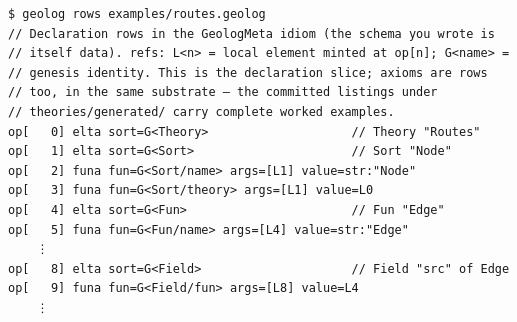 \begin{Verbatim}[fontsize=\small,frame=leftline,rulecolor=\color{accentmid},framesep=3mm,xleftmargin=3mm]
$ geolog rows examples/routes.geolog
// Declaration rows in the GeologMeta idiom (the schema you wrote is
// itself data). refs: L<n> = local element minted at op[n]; G<name> =
// genesis identity. This is the declaration slice; axioms are rows
// too, in the same substrate — the committed listings under
// theories/generated/ carry complete worked examples.
op[   0] elta sort=G<Theory>                    // Theory "Routes"
op[   1] elta sort=G<Sort>                      // Sort "Node"
op[   2] funa fun=G<Sort/name> args=[L1] value=str:"Node"
op[   3] funa fun=G<Sort/theory> args=[L1] value=L0
op[   4] elta sort=G<Fun>                       // Fun "Edge"
op[   5] funa fun=G<Fun/name> args=[L4] value=str:"Edge"
    ⋮
op[   8] elta sort=G<Field>                     // Field "src" of Edge
op[   9] funa fun=G<Field/fun> args=[L8] value=L4
    ⋮
\end{Verbatim}
